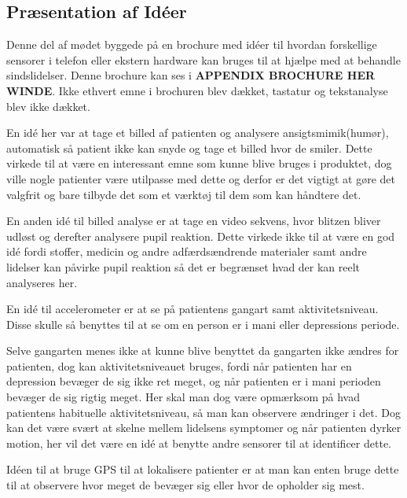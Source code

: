\subsection{Præsentation af Idéer}
Denne del af mødet byggede på en brochure med idéer til hvordan forskellige sensorer i telefon eller ekstern hardware kan bruges til at hjælpe med at behandle sindslidelser. 
Denne brochure kan ses i \textbf{APPENDIX BROCHURE HER WINDE}.
Ikke ethvert emne i brochuren blev dækket, tastatur og tekstanalyse blev ikke dækket.

\begin{description}[style=nextline]
\item[Billed analyse]
	En idé her var at tage et billed af patienten og analysere ansigtsmimik(humør), automatisk så patient ikke kan snyde og tage et billed hvor de smiler.
	Dette virkede til at være en interessant emne som kunne blive bruges i produktet, dog ville nogle patienter være utilpasse med dette og derfor er det vigtigt at gøre det valgfrit og bare tilbyde det som et værktøj til dem som kan håndtere det.
	
	En anden idé til billed analyse er at tage en video sekvens, hvor blitzen bliver udløst og derefter analysere pupil reaktion.
	Dette virkede ikke til at være en god idé fordi stoffer, medicin og andre adfærdsændrende materialer samt andre lidelser kan påvirke pupil reaktion så det er begrænset hvad der kan reelt analyseres her.
\item[Accelerometer]
	En idé til accelerometer er at se på patientens gangart samt aktivitetsniveau. Disse skulle så benyttes til at se om en person er i mani eller depressions periode.
	
	Selve gangarten menes ikke at kunne blive benyttet da gangarten ikke ændres for patienten, dog kan aktivitetsniveauet bruges, fordi når patienten har en depression bevæger de sig ikke ret meget, og når patienten er i mani perioden bevæger de sig rigtig meget. 
	Her skal man dog være opmærksom på hvad patientens habituelle aktivitetsniveau, så man kan observere ændringer i det.
	Dog kan det være svært at skelne mellem lidelsens symptomer og når patienten dyrker motion, her vil det være en idé at benytte andre sensorer til at identificer dette.
\item[Lokation]
	Idéen til at bruge GPS til at lokalisere patienter er at man kan enten bruge dette til at observere hvor meget de bevæger sig eller hvor de opholder sig mest. 
	

\end{description}
